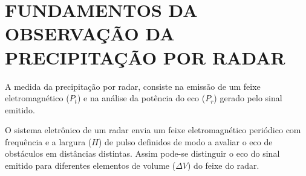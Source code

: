 





\section{FUNDAMENTOS DA OBSERVAÇÃO DA PRECIPITAÇÃO POR RADAR}
\label{chuvaEtemperatura}

A medida da precipitação por radar, consiste na emissão de um feixe eletromagnético ($P_t$) e na análise da potência do eco ($P_r$) gerado pelo sinal emitido.

O sistema eletrônico de um radar envia um feixe eletromagnético periódico com frequência e a largura ($H$) de pulso definidos de modo a avaliar o eco de obstáculos em distâncias distintas. Assim pode-se distinguir o eco do sinal emitido para diferentes elementos de volume ($\Delta V$) do feixe do radar.

